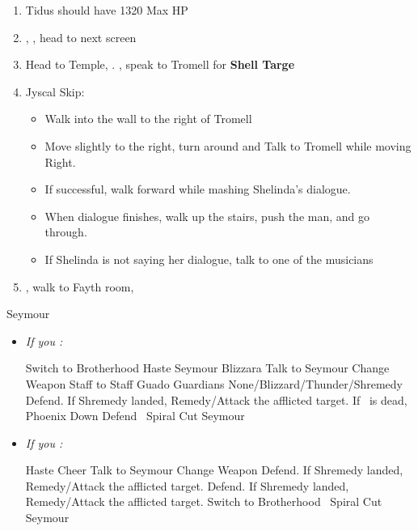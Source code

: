 \begin{enumerate}[resume]
  \item Tidus should have 1320 Max HP
  \item \sd, \cs[0:40], head to next screen
  \item Head to Temple, \sd. \save, speak to Tromell for \textbf{Shell Targe}
  \item Jyscal Skip:
        \begin{itemize}
          \item Walk into the wall to the right of Tromell
          \item Move slightly to the right, turn around and Talk to Tromell while moving Right.
          \item If successful, walk forward while mashing Shelinda's dialogue.
          \item When dialogue finishes, walk up the stairs, push the man, and go through.
          \item If Shelinda is not saying her dialogue, talk to one of the musicians
        \end{itemize}
  \item \sd, walk to Fayth room, \cs[2:10]
\end{enumerate}
\begin{battle}[3000]{Seymour}
  \begin{itemize}
  \item \textit{If you \wonblitz:}
  \begin{itemize}
  
    \tidusf Switch to Brotherhood
    \tidusf Haste \tidus
    \enemyf Seymour Blizzara
    \tidusf Talk to Seymour
    \yunaf Change Weapon Staff to Staff
    \enemyf Guado Guardians None/Blizzard/Thunder/Shremedy
    \kimahrif Defend. If Shremedy landed, Remedy/Attack the afflicted target. If \yuna\ is dead, Phoenix Down
    \switch{\yuna}{\auron}
    \auronf Defend
    \tidusf \od\ Spiral Cut Seymour
  \end{itemize}
  \item \textit{If you \lostblitz:}
  \begin{itemize}
  \tidusf Haste \tidus
  \tidusf Cheer
  \tidusf Talk to Seymour
  \yunaf Change Weapon
  \switch{\kimahri}{\rikku}
  \rikkuf Defend. If Shremedy landed, Remedy/Attack the afflicted target.
  \switch{\yuna}{\kimahri}
  \kimahrif Defend. If Shremedy landed, Remedy/Attack the afflicted target.
  \tidusf Switch to Brotherhood
    \tidusf \od\ Spiral Cut Seymour
  \end{itemize}
  \end{itemize}
\end{battle}
